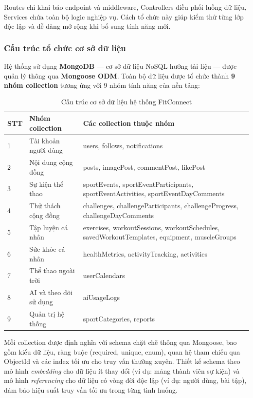 Routes chỉ khai báo endpoint và middleware, Controllers điều phối luồng dữ liệu, Services chứa toàn bộ logic nghiệp vụ. Cách tổ chức này giúp kiểm thử từng lớp độc lập và dễ dàng mở rộng khi bổ sung tính năng mới.

\subsubsection{Cấu trúc tổ chức cơ sở dữ liệu}
\label{subsubsec:impl_db_structure}

Hệ thống sử dụng \textbf{MongoDB} --- cơ sở dữ liệu NoSQL hướng tài liệu --- được quản lý thông qua \textbf{Mongoose ODM}. Toàn bộ dữ liệu được tổ chức thành \textbf{9 nhóm collection} tương ứng với 9 nhóm tính năng của nền tảng:

\begin{table}[H]
\centering
\caption{Cấu trúc cơ sở dữ liệu hệ thống FitConnect}
\label{tab:impl_db_structure}
\begin{tabular}{|p{0.8cm}|p{3.8cm}|>{\raggedright\arraybackslash}p{9.4cm}|}
\hline
\textbf{STT} & \textbf{Nhóm collection} & \textbf{Các collection thuộc nhóm} \\
\hline
1 & Tài khoản người dùng & users, follows, notifications \\
\hline
2 & Nội dung cộng đồng & posts, imagePost, commentPost, likePost \\
\hline
3 & Sự kiện thể thao & sportEvents, sportEventParticipants, sportEventActivities, sportEventDayComments \\
\hline
4 & Thử thách cộng đồng & challenges, challengeParticipants, challengeProgress, challengeDayComments \\
\hline
5 & Tập luyện cá nhân & exercises, workoutSessions, workoutSchedules, savedWorkoutTemplates, equipment, muscleGroups \\
\hline
6 & Sức khỏe cá nhân & healthMetrics, activityTracking, activities \\
\hline
7 & Thể thao ngoài trời & userCalendars \\
\hline
8 & AI và theo dõi sử dụng & aiUsageLogs \\
\hline
9 & Quản trị hệ thống & sportCategories, reports \\
\hline
\end{tabular}
\end{table}

Mỗi collection được định nghĩa với schema chặt chẽ thông qua Mongoose, bao gồm kiểu dữ liệu, ràng buộc (required, unique, enum), quan hệ tham chiếu qua ObjectId và các index tối ưu cho truy vấn thường xuyên. Thiết kế schema theo mô hình \textit{embedding} cho dữ liệu ít thay đổi (ví dụ: mảng thành viên sự kiện) và mô hình \textit{referencing} cho dữ liệu có vòng đời độc lập (ví dụ: người dùng, bài tập), đảm bảo hiệu suất truy vấn tối ưu trong từng tình huống.

